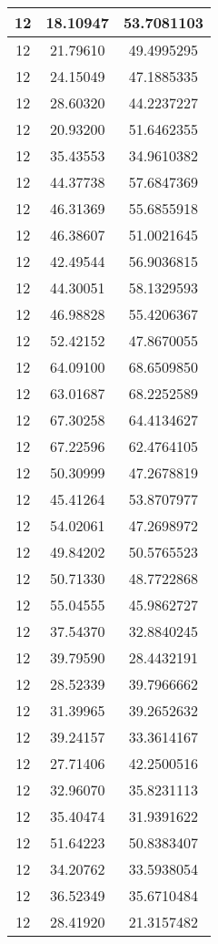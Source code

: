 \documentclass[
]{book}
\begin{document}
\begin{tabular}{c|c|c}
\hline
12 & 18.10947 & 53.7081103\\
\hline
12 & 21.79610 & 49.4995295\\
\hline
12 & 24.15049 & 47.1885335\\
\hline
12 & 28.60320 & 44.2237227\\
\hline
12 & 20.93200 & 51.6462355\\
\hline
12 & 35.43553 & 34.9610382\\
\hline
12 & 44.37738 & 57.6847369\\
\hline
12 & 46.31369 & 55.6855918\\
\hline
12 & 46.38607 & 51.0021645\\
\hline
12 & 42.49544 & 56.9036815\\
\hline
12 & 44.30051 & 58.1329593\\
\hline
12 & 46.98828 & 55.4206367\\
\hline
12 & 52.42152 & 47.8670055\\
\hline
12 & 64.09100 & 68.6509850\\
\hline
12 & 63.01687 & 68.2252589\\
\hline
12 & 67.30258 & 64.4134627\\
\hline
12 & 67.22596 & 62.4764105\\
\hline
12 & 50.30999 & 47.2678819\\
\hline
12 & 45.41264 & 53.8707977\\
\hline
12 & 54.02061 & 47.2698972\\
\hline
12 & 49.84202 & 50.5765523\\
\hline
12 & 50.71330 & 48.7722868\\
\hline
12 & 55.04555 & 45.9862727\\
\hline
12 & 37.54370 & 32.8840245\\
\hline
12 & 39.79590 & 28.4432191\\
\hline
12 & 28.52339 & 39.7966662\\
\hline
12 & 31.39965 & 39.2652632\\
\hline
12 & 39.24157 & 33.3614167\\
\hline
12 & 27.71406 & 42.2500516\\
\hline
12 & 32.96070 & 35.8231113\\
\hline
12 & 35.40474 & 31.9391622\\
\hline
12 & 51.64223 & 50.8383407\\
\hline
12 & 34.20762 & 33.5938054\\
\hline
12 & 36.52349 & 35.6710484\\
\hline
12 & 28.41920 & 21.3157482\\

\end{tabular}
\end{document}
